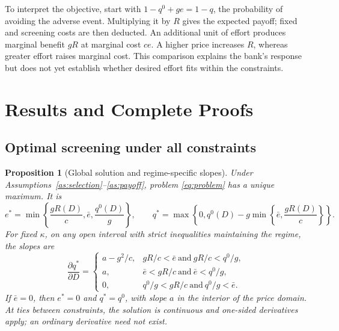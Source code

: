 \documentclass[11pt]{article}
\newtheorem{proposition}{Proposition}
\theoremstyle{definition}\newtheorem{assumption}{Assumption}
\begin{document}
To interpret the objective, start with $1-q^0+ge=1-q$, the probability of
avoiding the adverse event. Multiplying it by $R$ gives the expected payoff;
fixed and screening costs are then deducted. An additional unit of effort
produces marginal benefit $gR$ at marginal cost $ce$. A higher price increases
$R$, whereas greater effort raises marginal cost. This comparison explains
the bank's response but does not yet establish whether desired effort fits
within the constraints.

\section{Results and Complete Proofs}
\subsection{Optimal screening under all constraints}
\begin{proposition}[Global solution and regime-specific slopes]\label{p:global}
Under Assumptions~\ref{as:selection}--\ref{as:payoff}, problem
\eqref{eq:problem} has a unique maximum. It is
\begin{equation}\label{eq:opt}
e^*=\min\left\{\frac{gR(D)}c,\bar e,\frac{q^0(D)}g\right\},\qquad
q^*=\max\left\{0,q^0(D)-g\min\left\{\bar e,\frac{gR(D)}c\right\}\right\}.
\end{equation}
For fixed $\kappa$, on any open interval with strict inequalities maintaining
the regime, the slopes are
\begin{equation}\label{eq:regimes}
\frac{\partial q^*}{\partial D}=
\begin{cases}
a-g^2/c,&gR/c<\bar e\ \text{and}\ gR/c<q^0/g,\\
a,&\bar e<gR/c\ \text{and}\ \bar e<q^0/g,\\
0,&q^0/g<gR/c\ \text{and}\ q^0/g<\bar e.
\end{cases}
\end{equation}
If $\bar e=0$, then $e^*=0$ and $q^*=q^0$, with slope $a$ in the interior
of the price domain. At ties between constraints, the solution is continuous
and one-sided derivatives apply; an ordinary derivative need not exist.
\end{proposition}
\end{document}
